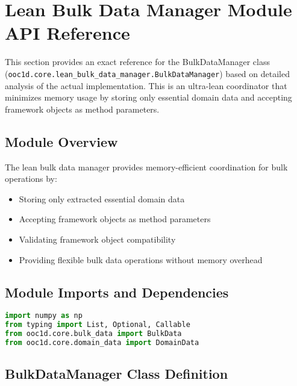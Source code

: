 %

\section{Lean Bulk Data Manager Module API Reference}
\label{sec:lean_bulk_data_manager_api}

This section provides an exact reference for the BulkDataManager class (\texttt{ooc1d.core.lean\_bulk\_data\_manager.BulkDataManager}) based on detailed analysis of the actual implementation. This is an ultra-lean coordinator that minimizes memory usage by storing only essential domain data and accepting framework objects as method parameters.

\subsection{Module Overview}

The lean bulk data manager provides memory-efficient coordination for bulk operations by:
\begin{itemize}
    \item Storing only extracted essential domain data
    \item Accepting framework objects as method parameters
    \item Validating framework object compatibility
    \item Providing flexible bulk data operations without memory overhead
\end{itemize}

\subsection{Module Imports and Dependencies}

\begin{lstlisting}[language=Python, caption=Module Dependencies]
import numpy as np
from typing import List, Optional, Callable
from ooc1d.core.bulk_data import BulkData
from ooc1d.core.domain_data import DomainData
\end{lstlisting}

\subsection{BulkDataManager Class Definition}
\label{subsec:lean_bulk_data_manager_class}

